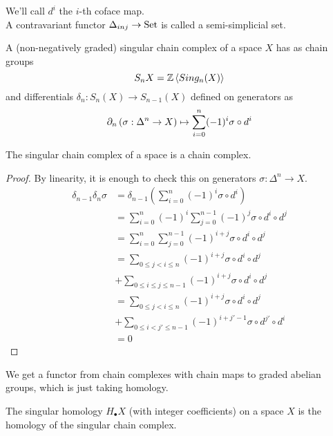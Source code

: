 \documentclass[../main.tex]{subfiles}
\begin{document}
We'll call $d^{i}$ the $i$-th coface map.\\
A contravariant functor $\Delta_{inj} \to \operatorname{Set}$ is called a semi-simplicial set.
\begin{defn}
	A (non-negatively graded) singular chain complex of a space $X$ has as chain groups
	\[ 
		S_n X = \mathbb{Z}\left\langle Sing_n( X) \right\rangle
	\]
and differentials $\delta_n :S_n( X) \to S_{n-1} ( X) $ defined on generators as
\[ 
\partial_n\left( \sigma: \Delta^{n}\to X\right) \mapsto \sum_{i=0}^{ n}( -1)^{i}\sigma\circ d^{i}
\]
\end{defn}
\begin{lemma}
The singular chain complex of a space is a chain complex.
\end{lemma}
\begin{proof}
By linearity, it is enough to check this on generators $\sigma: \Delta^{n}\to X$.\\
\begin{align*}
\delta_{n-1} \delta_n \sigma &= \delta_{n-1} \left( \sum_{i=0}^{ n} ( -1)^{i} \sigma\circ d^{i}\right) \\
&= \sum_{i=0}^{ n} ( -1)^{i} \sum_{j=0}^{n-1} ( -1)^{j}\sigma\circ d^{i}\circ d^{j}\\
&= \sum_{i=0}^{ n} \sum_{j=0}^{ n-1}( -1) ^{i+j} \sigma \circ d^{i}\circ d^{j}\\
&= \sum_{0 \leq j < i \leq n}^{ } ( -1) ^{i+j} \sigma\circ d^{i}\circ d^{j}\\
& + \sum_{0 \leq i \leq j \leq n-1}^{ } ( -1) ^{i+j} \sigma\circ d^{i}\circ d^{j} \\
&= \sum_{0 \leq j < i \leq n}^{ } ( -1) ^{i+j} \sigma\circ d^{i}\circ d^{j}\\
& + \sum_{0 \leq i < j' \leq n-1}^{ } ( -1) ^{i+j'-1} \sigma\circ d^{j'}\circ d^{i} \\
&= 0
\end{align*}
\end{proof}
\begin{lemma}
We get a functor from chain complexes with chain maps to graded abelian groups, which is just taking homology.
\end{lemma}
\begin{defn}
	The singular homology $H_{\bullet} X$ (with integer coefficients) on a space $X$ is the homology of the singular chain complex.
\end{defn}
\end{document}
